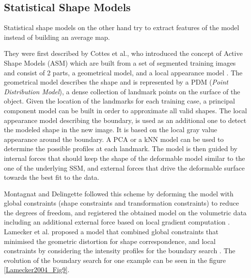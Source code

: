 \documentclass[]{article}
\begin{document}
	\subsection*{Statistical Shape Models}
	
	Statistical shape models on the other hand try to extract features of
	the model instead of building an average map.
	
	They were first described by Cottes et al., who introduced the concept of Active Shape Models (ASM) which
	are built from a set of segmented training images and consist of 2
	parts, a geometrical model, and a local appearance model \cite{Cottes1995}. The
	geometrical model describes the shape and is represented by a PDM
	(\emph{Point Distribution Model}), a dense collection of landmark points
	on the surface of the object. Given the location of the landmarks for
	each training case, a principal component model can be built in order to
	approximate all valid shapes. The local appearance model describing the
	boundary, is used as an additional one to detect the modeled shape in
	the new image. It is based on the local gray value appearance around the
	boundary. A PCA or a kNN model can be used to determine the possible
	profiles at each landmark. The model is then guided by internal
	forces that should keep the shape of the deformable model similar to the
	one of the underlying SSM, and external forces that drive the deformable
	surface towards the best fit to the data.
	
	Montagnat and Delingette followed this scheme by deforming the model with
	global constraints (shape constraints and transformation constraints) to
	reduce the degrees of freedom, and registered the obtained model on the
	volumetric data including an additional external force based on local
	gradient computation \cite{Montagnat1997}.
	Lamecker et al. proposed a model that combined global constraints that
	minimised the geometric distortion for shape correspondence, and local
	constraints by considering the intensity profiles for the boundary
	search \cite{Lamecker2004}. The evolution of the boundary search for one example can be seen in the figure \ref{Lamecker2004_Fig9}.
	
\end{document}
